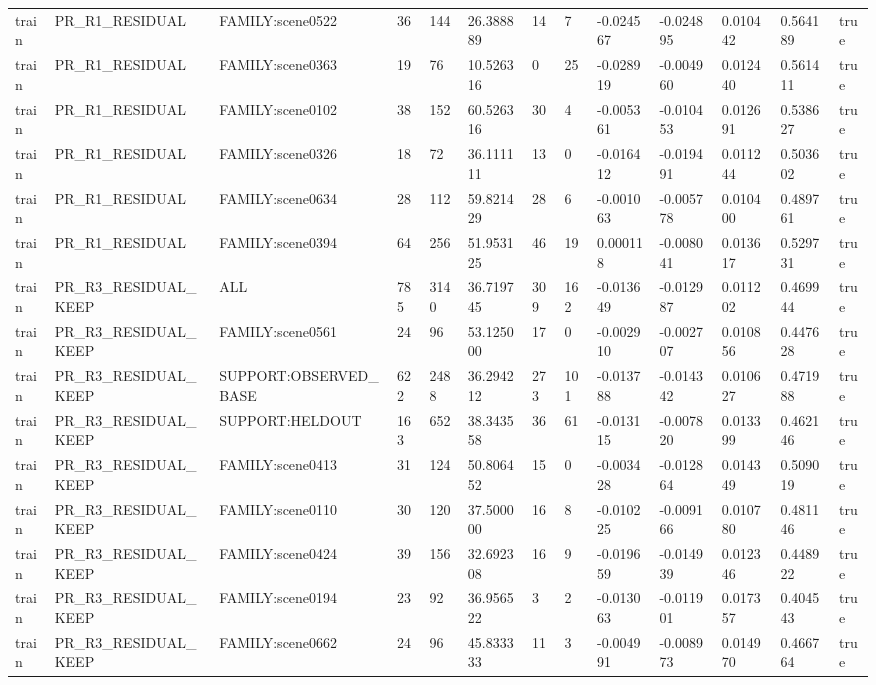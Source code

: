 \begin{tabular}{lllllllllllll}
train & PR\_R1\_RESIDUAL & FAMILY:scene0522 & 36 & 144 & 26.388889 & 14 & 7 & -0.024567 & -0.024895 & 0.010442 & 0.564189 & true \\
train & PR\_R1\_RESIDUAL & FAMILY:scene0363 & 19 & 76 & 10.526316 & 0 & 25 & -0.028919 & -0.004960 & 0.012440 & 0.561411 & true \\
train & PR\_R1\_RESIDUAL & FAMILY:scene0102 & 38 & 152 & 60.526316 & 30 & 4 & -0.005361 & -0.010453 & 0.012691 & 0.538627 & true \\
train & PR\_R1\_RESIDUAL & FAMILY:scene0326 & 18 & 72 & 36.111111 & 13 & 0 & -0.016412 & -0.019491 & 0.011244 & 0.503602 & true \\
train & PR\_R1\_RESIDUAL & FAMILY:scene0634 & 28 & 112 & 59.821429 & 28 & 6 & -0.001063 & -0.005778 & 0.010400 & 0.489761 & true \\
train & PR\_R1\_RESIDUAL & FAMILY:scene0394 & 64 & 256 & 51.953125 & 46 & 19 & 0.000118 & -0.008041 & 0.013617 & 0.529731 & true \\
train & PR\_R3\_RESIDUAL\_KEEP & ALL & 785 & 3140 & 36.719745 & 309 & 162 & -0.013649 & -0.012987 & 0.011202 & 0.469944 & true \\
train & PR\_R3\_RESIDUAL\_KEEP & FAMILY:scene0561 & 24 & 96 & 53.125000 & 17 & 0 & -0.002910 & -0.002707 & 0.010856 & 0.447628 & true \\
train & PR\_R3\_RESIDUAL\_KEEP & SUPPORT:OBSERVED\_BASE & 622 & 2488 & 36.294212 & 273 & 101 & -0.013788 & -0.014342 & 0.010627 & 0.471988 & true \\
train & PR\_R3\_RESIDUAL\_KEEP & SUPPORT:HELDOUT & 163 & 652 & 38.343558 & 36 & 61 & -0.013115 & -0.007820 & 0.013399 & 0.462146 & true \\
train & PR\_R3\_RESIDUAL\_KEEP & FAMILY:scene0413 & 31 & 124 & 50.806452 & 15 & 0 & -0.003428 & -0.012864 & 0.014349 & 0.509019 & true \\
train & PR\_R3\_RESIDUAL\_KEEP & FAMILY:scene0110 & 30 & 120 & 37.500000 & 16 & 8 & -0.010225 & -0.009166 & 0.010780 & 0.481146 & true \\
train & PR\_R3\_RESIDUAL\_KEEP & FAMILY:scene0424 & 39 & 156 & 32.692308 & 16 & 9 & -0.019659 & -0.014939 & 0.012346 & 0.448922 & true \\
train & PR\_R3\_RESIDUAL\_KEEP & FAMILY:scene0194 & 23 & 92 & 36.956522 & 3 & 2 & -0.013063 & -0.011901 & 0.017357 & 0.404543 & true \\
train & PR\_R3\_RESIDUAL\_KEEP & FAMILY:scene0662 & 24 & 96 & 45.833333 & 11 & 3 & -0.004991 & -0.008973 & 0.014970 & 0.466764 & true \\

\end{tabular}
